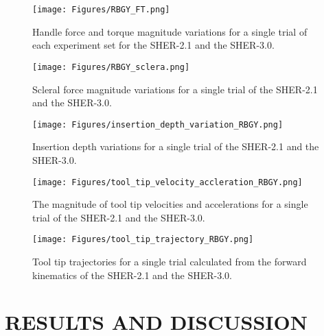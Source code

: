 \documentclass[letterpaper, 10 pt, conference]{ieeeconf}  %
\begin{document}
\begin{figure}[t!]
  \centering
    \texttt{[image: Figures/RBGY\_FT.png]}
      \caption{Handle force and torque magnitude variations for a single trial of each experiment set for the SHER-2.1 and the SHER-3.0.}
      \label{fig: RBGY_FT}
\end{figure}
\begin{figure}[t!]
  \centering
    \texttt{[image: Figures/RBGY\_sclera.png]}
      \caption{Scleral force magnitude variations for a single trial of the SHER-2.1 and the SHER-3.0. %
      }
      \label{fig: RBGY_sclera}
\end{figure}
\begin{figure}[t!]
  \centering
  \hspace*{1.5mm}
    \texttt{[image: Figures/insertion\_depth\_variation\_RBGY.png]}
      \caption{Insertion depth variations for a single trial of the SHER-2.1 and the SHER-3.0.}
      \label{fig: insertion_depth_variation}
\end{figure}
\begin{figure}[t!]
  \centering
    \texttt{[image: Figures/tool\_tip\_velocity\_accleration\_RBGY.png]}
      \caption{The magnitude of tool tip velocities and accelerations for a single trial of the SHER-2.1 and the SHER-3.0.}
      \label{fig: tool_tip_velocity_accleration}
\end{figure}
\begin{figure}[t!]
  \centering
    \texttt{[image: Figures/tool\_tip\_trajectory\_RBGY.png]}
      \caption{Tool tip trajectories for a single trial calculated from the forward kinematics of the SHER-2.1 and the SHER-3.0.}
      \label{fig: tool_tip_trajectory}
\end{figure}

\section{RESULTS AND DISCUSSION}
\end{document}
